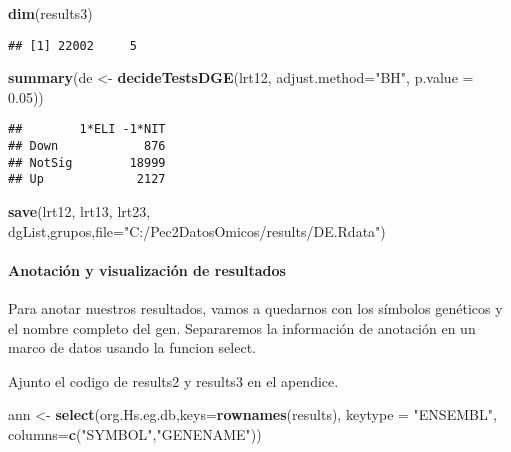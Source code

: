 \documentclass[
]{article}
\newenvironment{Shaded}{\begin{snugshade}}{\end{snugshade}}
\newcommand{\DataTypeTok}[1]{\textcolor[rgb]{0.13,0.29,0.53}{#1}}
\newcommand{\FloatTok}[1]{\textcolor[rgb]{0.00,0.00,0.81}{#1}}
\newcommand{\KeywordTok}[1]{\textcolor[rgb]{0.13,0.29,0.53}{\textbf{#1}}}
\newcommand{\NormalTok}[1]{#1}
\newcommand{\StringTok}[1]{\textcolor[rgb]{0.31,0.60,0.02}{#1}}
\begin{document}
\begin{Shaded}
\begin{Highlighting}[]
\KeywordTok{dim}\NormalTok{(results3)}
\end{Highlighting}
\end{Shaded}

\begin{verbatim}
## [1] 22002     5
\end{verbatim}

\begin{Shaded}
\begin{Highlighting}[]
\KeywordTok{summary}\NormalTok{(de <-}\StringTok{ }\KeywordTok{decideTestsDGE}\NormalTok{(lrt12,}
                             \DataTypeTok{adjust.method=}\StringTok{"BH"}\NormalTok{, }\DataTypeTok{p.value =} \FloatTok{0.05}\NormalTok{))}
\end{Highlighting}
\end{Shaded}

\begin{verbatim}
##        1*ELI -1*NIT
## Down            876
## NotSig        18999
## Up             2127
\end{verbatim}

\begin{Shaded}
\begin{Highlighting}[]
\KeywordTok{save}\NormalTok{(lrt12,}
\NormalTok{     lrt13,}
\NormalTok{     lrt23,}
\NormalTok{     dgList,grupos,}\DataTypeTok{file=}\StringTok{"C:/Pec2DatosOmicos/results/DE.Rdata"}\NormalTok{)}
\end{Highlighting}
\end{Shaded}

\hypertarget{anotaciuxf3n-y-visualizaciuxf3n-de-resultados}{%
\paragraph{Anotación y visualización de
resultados}\label{anotaciuxf3n-y-visualizaciuxf3n-de-resultados}}

Para anotar nuestros resultados, vamos a quedarnos con los símbolos
genéticos y el nombre completo del gen. Separaremos la información de
anotación en un marco de datos usando la funcion select.

Ajunto el codigo de results2 y results3 en el apendice.

\begin{Shaded}
\begin{Highlighting}[]
\NormalTok{ann <-}\StringTok{ }\KeywordTok{select}\NormalTok{(org.Hs.eg.db,}\DataTypeTok{keys=}\KeywordTok{rownames}\NormalTok{(results), }\DataTypeTok{keytype =} \StringTok{"ENSEMBL"}\NormalTok{,}
              \DataTypeTok{columns=}\KeywordTok{c}\NormalTok{(}\StringTok{"SYMBOL"}\NormalTok{,}\StringTok{"GENENAME"}\NormalTok{))}
\end{Highlighting}
\end{Shaded}
\end{document}
